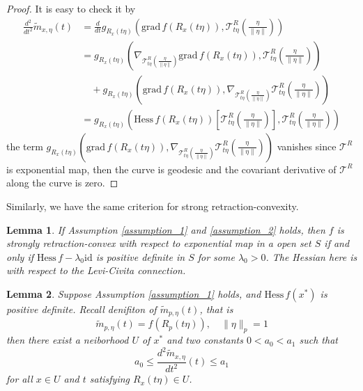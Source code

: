 \documentclass[12pt,a4paper,draft]{article}  %
\newtheorem{lemma}{Lemma}[section]
\theoremstyle{definition}
\numberwithin{equation}{section}
\newcommand{\grad}{\mathrm{grad}\,}
\newcommand{\hess}{\mathrm{Hess}\,}
\newcommand{\VT}{\mathcal{T}}
\begin{document}
\begin{proof}
        It is easy to check it by
        \[
        \begin{aligned}
                \frac{d^2}{dt^2}\widetilde{m}_{x,\eta}(t) &= \frac{d}{dt}g_{R_x(t\eta)}\left(\grad f\left(R_x(t\eta)\right), \VT^R_{t\eta}\left(\frac{\eta}{\|\eta\|}\right)\right)\\
                &= g_{R_x(t\eta)}\left(\nabla_{\VT^R_{t\eta}\left(\frac{\eta}{\|\eta\|}\right)} \grad f\left(R_x(t\eta)\right), \VT^R_{t\eta}\left(\frac{\eta}{\|\eta\|}\right)\right) \\ &\,\,\,\,\,\,+ g_{R_x(t\eta)}\left(\grad f\left(R_x(t\eta)\right), \nabla_{\VT^R_{t\eta}\left(\frac{\eta}{\|\eta\|}\right)} \VT^R_{t\eta}\left(\frac{\eta}{\|\eta\|}\right)\right)\\
                &= g_{R_x(t\eta)}\left(\hess f\left(R_x(t\eta)\right)\left[\VT^R_{t\eta}\left(\frac{\eta}{\|\eta\|}\right)\right], \VT^R_{t\eta}\left(\frac{\eta}{\|\eta\|}\right)\right)
        \end{aligned}
        \]
        the term $g_{R_x(t\eta)}\left(\grad f\left(R_x(t\eta)\right), \nabla_{\VT^R_{t\eta}\left(\frac{\eta}{\|\eta\|}\right)} \VT^R_{t\eta}\left(\frac{\eta}{\|\eta\|}\right)\right)$ vanishes since $\VT^R$ is exponential map, then the curve is geodesic and the covariant derivative of $\VT^R$ along the curve is zero.
\end{proof}
Similarly, we have the same criterion for strong retraction-convexity.
\begin{lemma}\label{criterion_strong_retraction_convexity}
        If Assumption \ref{assumption_1} and \ref{assumption_2} holds, then $f$ is strongly retraction-convex with respect to exponential map in a open set $S$ if and only if $\hess f - \lambda_0\mathrm{id}$ is positive definite in $S$ for some $\lambda_0>0$. The Hessian here is with respect to the Levi-Civita connection.
\end{lemma}
\begin{lemma}
        Suppose Assumption \ref{assumption_1} holds, and $\hess f(x^\ast)$ is positive definite. Recall denifiton of $\widetilde{m}_{p,\eta}(t)$, that is
        \[
\widetilde{m}_{p,\eta}(t) = f\left(R_p(t\eta)\right),\quad\|\eta\|_p = 1
        \]
        then there exist a neiborhood $U$ of $x^\ast$ and two constants $0<a_0<a_1$ such that 
        \[
        a_0\leq \frac{d^2\widetilde{m}_{x,\eta}}{dt^2}(t) \leq a_1
        \]
        for all $x\in U$ and $t$ satisfying $R_x(t\eta)\in U$.
\end{lemma}
\end{document}
